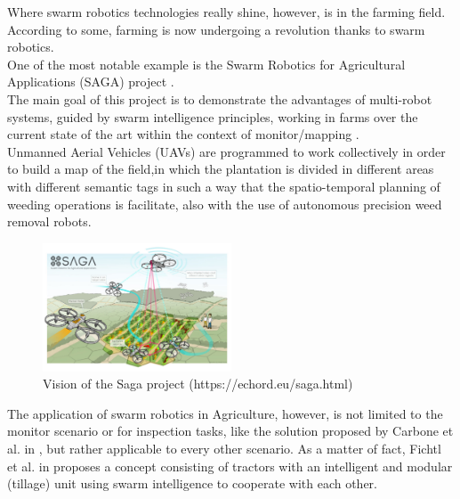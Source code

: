 \documentclass[conference]{IEEEtran}
\begin{document}
Where swarm robotics technologies really shine, however, is in the farming field. According to some, farming is now undergoing a revolution thanks to swarm robotics. \cite{revolution}\\
One of the most notable example is the Swarm Robotics for Agricultural Applications (SAGA) project \cite{Albani:2017tp} \cite{AlbaniEtAl:BICT2019}.\\
The main goal of this project is to demonstrate the advantages of multi-robot systems, guided by swarm intelligence principles, working in farms over the current state of the art within the context of monitor/mapping \cite{Albani:2017tp}.\\
Unmanned Aerial Vehicles (UAVs) are programmed to work collectively in order to build a map of the field,in which the plantation is divided in different areas with different semantic tags in such a way that the spatio-temporal planning of weeding operations is facilitate, also with the use of autonomous precision weed removal robots.

\begin{figure}[htb]
    \centering
    \includegraphics[width=0.5\textwidth]{img/saga.jpg}
    \caption{Vision of the Saga project (https://echord.eu/saga.html) }
    \label{fig:saga_project}
\end{figure}

The application of swarm robotics in Agriculture, however, is not limited to the monitor scenario or for inspection tasks, like the solution proposed by Carbone et al. in \cite{Carbone2018}, but rather applicable to every other scenario. As a matter of fact, Fichtl et al. in \cite{Fichtl2019FeldschwarmModularAS} proposes a concept consisting of tractors with an intelligent and modular (tillage) unit using swarm intelligence to cooperate with each other. 
\end{document}
